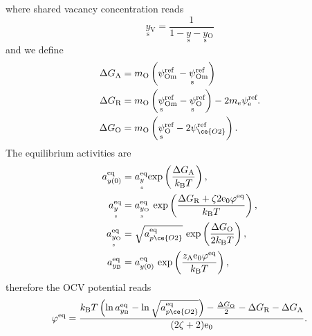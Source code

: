 \documentclass{article}
\numberwithin{equation}{section}
\newcommand{\us}[1]{\underset{\textrm{s}}{#1}{}}
\def\kB{k_\mathrm{B}}
\def\Ox{\mathrm{O}}
\newcommand{\OO}{{\ce{O2}}}
\newcommand{\ysV}{\us y_{\textrm{V}}}
\def\yOs{{\us y_\textrm{O}}}
\def\yAs{{\us y}}
\def\pO2{{p\OO}}
\def\yB{{y_\text{B}}}
\def\efac{\zeta}
\def\DGA{\Delta G_\textrm{A}  }
\def\DGR{\Delta G_\textrm{R}  }
\def\DGO{\Delta G_\textrm{O}  }
\def\eq{\textrm{eq}}
\def\REF{\textrm{ref}}
\begin{document}
where shared vacancy concentration reads 
$$ \ysV = \frac{1}{1 - \yAs - \yOs}$$
\begin{subequations}

\end{subequations}
and we define
\begin{subequations}
\begin{align}
\DGA
&=
m_\Ox
\left(
	\psi_{\textrm{Om}}^\REF
	-
	\us \psi_{\textrm{Om}}^\REF
\right)
\\
\DGR
&= 
m_\Ox
\left(
	\us \psi_{\textrm{Om}}^\REF
	-
	\us \psi_{\Ox}^\REF
\right)
-
2 m_\textrm{e} \psi_{\textrm{e}}^\REF.
\\
\DGO
&= 
m_\Ox
\left(
	\us \psi_{\Ox}^\REF
	-
	2 \psi_{\OO}^\REF
\right).
\end{align}
\end{subequations}
The equilibrium activities are
\begin{subequations}
\begin{align}
a_{y(0)}^\eq 
&= 
a_\yAs^\eq  \text{exp}
\left(
	\frac{\DGA}{\kB T}
\right),
\\
a_\yAs^\eq 
&= 
a_\yOs^\eq \ \text{exp}
\left(
	\frac{\DGR + \efac 2 \text{e}_0 \varphi^\eq}{\kB T}
\right),
\\
a_\yOs^\eq 
&= 
\sqrt{a_{p\OO}^\eq} \ \text{exp}
\left(
	\frac{\DGO}{2 \kB T}
\right),
\\
a_{\yB}^\eq
&=
a_{y(0)}^\eq \ \text{exp}
\left(
	\frac{z_\text{A} \text{e}_0 \varphi^\eq}{\kB T}
\right),
\end{align}
\end{subequations}
therefore the OCV potential reads
\begin{subequations}
\begin{align}
\varphi^\eq 
= 
\frac{
	\kB T 
	\left(
		\ln a_\yB^\eq
		-
		\ln \sqrt{a_\pO2^\eq} 
	\right)
	- 
	\frac{\DGO}{2}
	-
	\DGR
	-
	\DGA
}{
	(2 \efac + 2) \text{e}_0
}.
\end{align}
\end{subequations}
\end{document}
